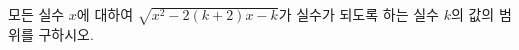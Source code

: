 \hspace*{2mm}\begin{minipage}[t]{\dimexpr\linewidth-2mm\relax}\vspace{0pt}
모든 실수 $x$에 대하여 $\sqrt{x^2-2(k+2)x-k}$가 실수가 되도록 하는 실수 $k$의 값의 범위를 구하시오.\end{minipage}
